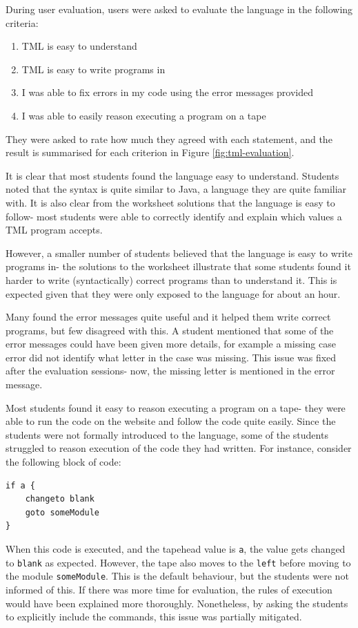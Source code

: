 During user evaluation, users were asked to evaluate the language in the following criteria:
\begin{enumerate}
    \item TML is easy to understand
    \item TML is easy to write programs in
    \item I was able to fix errors in my code using the error messages provided
    \item I was able to easily reason executing a program on a tape
\end{enumerate}
They were asked to rate how much they agreed with each statement, and the result is summarised for each criterion in Figure \ref{fig:tml-evaluation}. 

It is clear that most students found the language easy to understand. Students noted that the syntax is quite similar to Java, a language they are quite familiar with. It is also clear from the worksheet solutions that the language is easy to follow- most students were able to correctly identify and explain which values a TML program accepts.

However, a smaller number of students believed that the language is easy to write programs in- the solutions to the worksheet illustrate that some students found it harder to write (syntactically) correct programs than to understand it. This is expected given that they were only exposed to the language for about an hour.

Many found the error messages quite useful and it helped them write correct programs, but few disagreed with this. A student mentioned that some of the error messages could have been given more details, for example a missing case error did not identify what letter in the case was missing. This issue was fixed after the evaluation sessions- now, the missing letter is mentioned in the error message.

Most students found it easy to reason executing a program on a tape- they were able to run the code on the website and follow the code quite easily. Since the students were not formally introduced to the language, some of the students struggled to reason execution of the code they had written. For instance, consider the following block of code:
\begin{lstlisting}[language=TML]
if a {
    changeto blank
    goto someModule
}
\end{lstlisting}
When this code is executed, and the tapehead value is \texttt{a}, the value gets changed to \texttt{blank} as expected. However, the tape also moves to the \texttt{left} before moving to the module \texttt{someModule}. This is the default behaviour, but the students were not informed of this. If there was more time for evaluation, the rules of execution would have been explained more thoroughly. Nonetheless, by asking the students to explicitly include the commands, this issue was partially mitigated.

